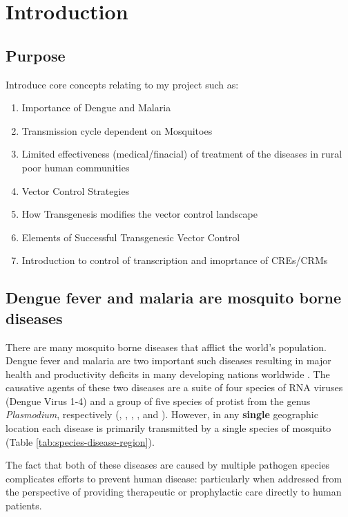\chapter{Introduction}

\section{Purpose}

Introduce core concepts relating to my project such as:

\begin{enumerate}
\item \chkBox Importance of Dengue and Malaria
\item \chkBoxX Transmission cycle dependent on Mosquitoes
\item \chkBox Limited effectiveness (medical/finacial) of treatment of the diseases in rural poor human communities
\item \chkBoxX Vector Control Strategies
\item \chkBoxX How Transgenesis modifies the vector control landscape
\item \chkBox Elements of Successful Transgenesic Vector Control
\item \chkBoxX Introduction to control of transcription and imoprtance of \glspl{CRE}/\glspl{CRM}
\end{enumerate}


\section{Dengue fever and malaria are mosquito borne diseases}

There are many mosquito borne diseases that afflict the world's population.
Dengue fever and malaria are two important such diseases resulting in major health and productivity deficits in many developing nations worldwide \CITEME.
The causative agents of these two diseases are a suite of four species of RNA viruses (Dengue Virus 1-4) and a group of five species of protist from the genus \textit{Plasmodium}, respectively (\Plf, \Pv, \Po, \Pm, and \Pk).
However, in any \textbf{single} geographic location each disease is primarily transmitted by a single species of mosquito \CITEME (Table \ref{tab:species-disease-region}). 



The fact that both of these diseases are caused by multiple pathogen species complicates efforts to prevent human disease: particularly when addressed from the perspective of providing therapeutic or prophylactic care directly to human patients.

